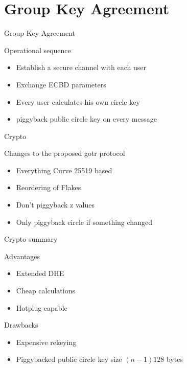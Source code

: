 \section{Group Key Agreement}
\begin{frame}{Group Key Agreement}
	\begin{block}{Operational sequence}
		\begin{itemize}
			\item Establish a secure channel with each user
			\item Exchange ECBD parameters
			\item Every user calculates his own circle key
			\item piggyback public circle key on every message
		\end{itemize}
	\end{block}
\end{frame}

\begin{frame}{Crypto}
	\begin{block}{Changes to the proposed gotr protocol}
		\begin{itemize}
			\item Everything Curve 25519 based
			\item Reordering of Flakes
			\item Don't piggyback z values
			\item Only piggyback circle if something changed
		\end{itemize}
	\end{block}
\end{frame}

\begin{frame}{Crypto summary}
	\begin{block}{Advantages}
		\begin{itemize}
			\item Extended DHE
			\item Cheap calculations
			\item Hotplug capable
		\end{itemize}
	\end{block}
	\begin{alertblock}{Drawbacks}
		\begin{itemize}
			\item Expensive rekeying
			\item Piggybacked public circle key size $(n-1)128$ bytes
		\end{itemize}
	\end{alertblock}
\end{frame}
